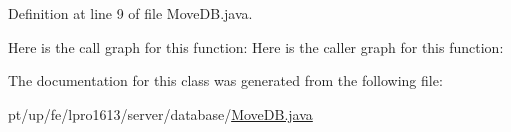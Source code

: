 Definition at line 9 of file Move\+D\+B.\+java.

Here is the call graph for this function\+:
Here is the caller graph for this function\+:


The documentation for this class was generated from the following file\+:\begin{DoxyCompactItemize}
\item 
pt/up/fe/lpro1613/server/database/\hyperlink{_move_d_b_8java}{Move\+D\+B.\+java}\end{DoxyCompactItemize}
